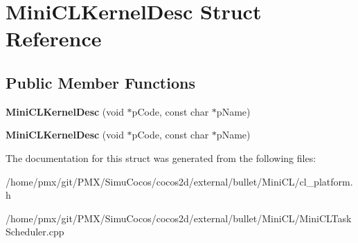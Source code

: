 \hypertarget{structMiniCLKernelDesc}{}\section{Mini\+C\+L\+Kernel\+Desc Struct Reference}
\label{structMiniCLKernelDesc}
\subsection*{Public Member Functions}
\begin{DoxyCompactItemize}
\item 
\mbox{\label{structMiniCLKernelDesc_a8772aab7773773dc3ddd63d7b39590b4}} 
{\bfseries Mini\+C\+L\+Kernel\+Desc} (void $\ast$p\+Code, const char $\ast$p\+Name)
\item 
\mbox{\label{structMiniCLKernelDesc_a8772aab7773773dc3ddd63d7b39590b4}} 
{\bfseries Mini\+C\+L\+Kernel\+Desc} (void $\ast$p\+Code, const char $\ast$p\+Name)
\end{DoxyCompactItemize}


The documentation for this struct was generated from the following files\+:\begin{DoxyCompactItemize}
\item 
/home/pmx/git/\+P\+M\+X/\+Simu\+Cocos/cocos2d/external/bullet/\+Mini\+C\+L/cl\+\_\+platform.\+h\item 
/home/pmx/git/\+P\+M\+X/\+Simu\+Cocos/cocos2d/external/bullet/\+Mini\+C\+L/Mini\+C\+L\+Task\+Scheduler.\+cpp\end{DoxyCompactItemize}
